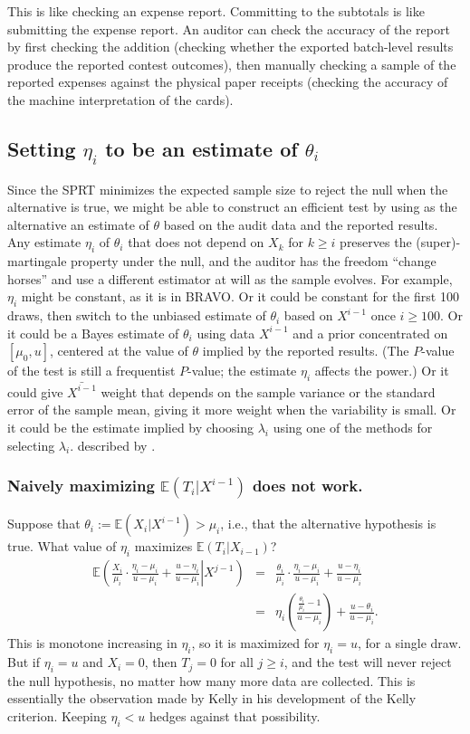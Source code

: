 \documentclass[12pt,runningheads]{llncs}
\newcommand{\EE}{\mathbb{E}}
\begin{document}
{This is like checking an expense report. Committing to the subtotals is like submitting the expense report.
An auditor can check the accuracy of the report by first checking the addition 
(checking whether the exported batch-level results produce the reported contest outcomes), then manually checking a sample of 
the reported expenses against the physical paper receipts (checking the accuracy of the machine interpretation of the cards).


\subsection{Setting $\eta_i$ to be an estimate of $\theta_i$}
Since the SPRT minimizes the expected sample size to reject the null when the alternative is true,
we might be able to construct an efficient test by using as the alternative an estimate of $\theta$
based on the audit data and the reported results.
Any estimate $\eta_i$ of $\theta_i$ that does not depend on $X_k$ for $k \ge i$ preserves the (super)-martingale property
under the null, 
and the auditor has the freedom ``change horses'' and use a different estimator
at will as the sample evolves. 
For example, $\eta_i$ might be constant, as it is in BRAVO.
Or it could be constant for the first 100 draws, then switch to the unbiased estimate of $\theta_i$ 
based on $X^{i-1}$ once $i \ge 100$.
Or it could be a Bayes estimate of $\theta_i$ using data $X^{i-1}$ and a prior concentrated on
$[\mu_0, u]$, centered at the value of $\theta$ implied by the reported results.
(The $P$-value of the test is still a frequentist $P$-value; the estimate $\eta_i$ affects the power.)
Or it could give $\bar{X^{i-1}}$ weight that depends on the sample variance or the standard error of the sample mean, 
giving it more weight when the variability is small.
Or it could be the estimate implied by choosing $\lambda_i$ using one of the methods for selecting $\lambda_i$.
described by \cite{waudby-smithRamdas21}.

\subsubsection{Naively maximizing $\EE (T_i| X^{i-1})$ does not work.}
Suppose that $\theta_i := \EE (X_i | X^{i-1}) > \mu_i$, i.e., that the alternative hypothesis is true. 
What value of $\eta_i$ maximizes $\EE (T_i | X_{i-1})$?
\begin{eqnarray}
\EE \left ( \left . \frac{X_i}{\mu_i} \cdot \frac{\eta_i-\mu_i}{u-\mu_i} + \frac{u-\eta_i}{u-\mu_i} \right | X^{j-1} \right ) &=&
\frac{\theta_i}{\mu_i} \cdot \frac{\eta_i-\mu_i}{u-\mu_i} + \frac{u-\eta_i}{u-\mu_i} \nonumber \\
&=& \eta_i \left ( \frac{\frac{\theta_i}{\mu_i} - 1}{u-\mu_i} \right ) + \frac{u-\theta_i}{u-\mu_i}.
\end{eqnarray}
This is monotone increasing in $\eta_i$, so it is maximized for $\eta_i = u$, for a single draw.
But if $\eta_i=u$ and $X_i = 0$, then $T_j = 0$ for all $j \ge i$, and the test will never reject the null
hypothesis, no matter how many more data are collected.
This is essentially the observation made by Kelly \cite{kelly56} in his development of the
Kelly criterion.
Keeping $\eta_i < u$ hedges against that possibility.

}
\end{document}
